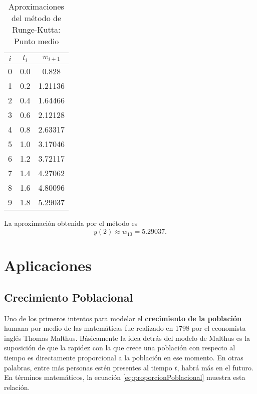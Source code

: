 \begin{exerciseT}
{\begin{align*}
	\end{align*}
	\begin{table}[H]
		\centering
		\begin{tabular}{c|c|c}
		    \toprule
			$i$ & $t_i$ & $w_{i+1}$\\
			\midrule
			0 & 0.0 & 0.828 \\
			1 & 0.2 & 1.21136 \\
			2 & 0.4 & 1.64466 \\
			3 & 0.6 & 2.12128 \\
			4 & 0.8 & 2.63317 \\
			5 & 1.0 & 3.17046 \\
			6 & 1.2 & 3.72117 \\
			7 & 1.4 & 4.27062 \\
			8 & 1.6 & 4.80096 \\
			9 & 1.8 & 5.29037 \\
			\bottomrule
		\end{tabular}
		\caption{Aproximaciones del método de Runge-Kutta: Punto medio}
	\end{table}
    La aproximación obtenida por el método es \[y(2) \approx w_{10} = 5.29037.\]	
}\end{exerciseT}



\section{Aplicaciones}

\subsection{Crecimiento Poblacional}

Uno de los primeros intentos para modelar el \textbf{crecimiento de la población} humana por medio de las matemáticas fue realizado en 
1798 por el economista inglés Thomas Malthus. Básicamente la idea detrás del modelo de Malthus es la suposición de que la rapidez con 
la que crece una población con respecto al tiempo es directamente proporcional a la población en ese momento. En otras palabras, entre 
más personas estén presentes al tiempo $t$, habrá más en el futuro. En términos matemáticos, la ecuación \ref{eq:proporcionPoblacional} 
muestra esta relación.

